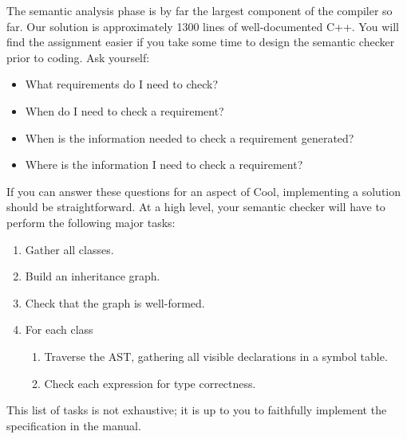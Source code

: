 The semantic analysis phase is by far the largest component of the compiler
so far.  Our solution is approximately 1300 lines of well-documented C++.
You will find the assignment easier if you take some time to design the
semantic checker prior to coding.  Ask yourself:
\begin{itemize}
\item What requirements do I need to check?
\item When do I need to check a requirement?
\item When is the information needed to check a requirement generated?
\item Where is the information I need to check a requirement?
\end{itemize}
If you can answer these questions for an aspect of Cool, implementing
a solution should be straightforward.
At a high level, your semantic checker will have to perform the
following major tasks:
\begin{enumerate}
\item Gather all classes.
\item Build an inheritance graph.
\item Check that the graph is well-formed.
\item For each class
\begin{enumerate}
\item Traverse the AST, gathering all visible declarations in a symbol table.
\item Check each expression for type correctness.
\end{enumerate}
\end{enumerate}
This list of tasks is not exhaustive; it is up to you to faithfully implement
the specification in the manual.



